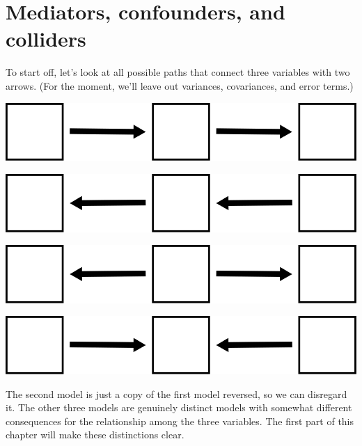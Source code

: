 \documentclass[
]{book}
\begin{document}
\hypertarget{mediation-paths}{%
\section{Mediators, confounders, and colliders}\label{mediation-paths}}

To start off, let's look at all possible paths that connect three variables with two arrows. (For the moment, we'll leave out variances, covariances, and error terms.)

\begin{center}\includegraphics{graphics/mediator_right} \end{center}

\begin{center}\includegraphics{graphics/mediator_left} \end{center}

\begin{center}\includegraphics{graphics/confounder} \end{center}

\begin{center}\includegraphics{graphics/collider} \end{center}

The second model is just a copy of the first model reversed, so we can disregard it. The other three models are genuinely distinct models with somewhat different consequences for the relationship among the three variables. The first part of this chapter will make these distinctions clear.
\end{document}
